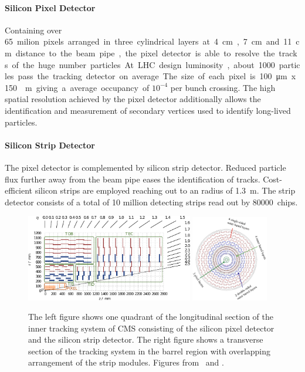 \paragraph{Silicon Pixel Detector} Containing over \SI{65} milion pixels
arranged in three cylindrical layers at \SI{4}{\centi\meter},
\SI{7}{\centi\meter} and \SI{11}{\centi\meter} distance to the beam pipe, the
pixel detector is able to resolve the tracks of the huge number particles. At
LHC design luminosity, about 1000 particles pass the tracking detector on
average. The size of each pixel is \SI{100}{\micro \meter} x \SI{150}{\micro
\meter} giving a average occupancy of $10^{-4}$ per bunch crossing.  The high
spatial resolution achieved by the pixel detector additionally allows the
identification and measurement of secondary vertices used to identify long-lived
particles.

\paragraph{Silicon Strip Detector} The pixel detector is complemented by silicon
strip detector. Reduced particle flux further away from the beam pipe eases the identification
of tracks. Cost-efficient silicon strips are employed reaching out to
an radius of \SI{1.3}{\meter}. The strip detector consists of a total of 10 million
detecting strips read out by \SI{80000} chips. 

\begin{figure}[htp]
    \centering
    \includegraphics[width=0.65\textwidth]{figures/cms_detector/tracker.pdf}\hfill
    \includegraphics[width=0.3\textwidth]{figures/cms_detector/tracking_sytem_barrel_slice.png}
    \caption[Inner Tracking System]{The left figure shows one quadrant of the
        longitudinal section of the inner tracking system of CMS consisting of the
        silicon pixel detector and the silicon strip detector. The right figure shows a
        transverse section of the tracking system in the barrel region with overlapping
        arrangement of the strip modules. Figures from~\cite{Berger:2014aca} and
        \cite{cmsweb:innertracker}.}
    \label{fig:cms:inner_tracking}
\end{figure}

